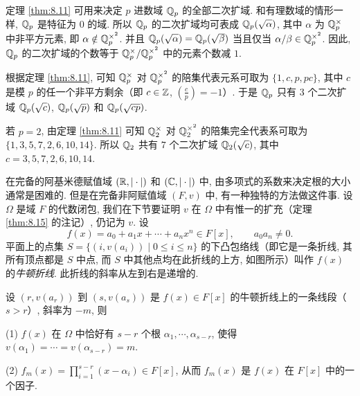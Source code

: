 \begin{remark}
定理 \ref{thm:8.11} 可用来决定 $p$ 进数域 $\mathbb{Q}_p$ 的全部二次扩域. 和有理数域的情形一样, $\mathbb{Q}_p$ 是特征为 $0$ 的域. 所以 $\mathbb{Q}_p$ 的二次扩域均可表成 $\mathbb{Q}_p(\sqrt{\alpha})$, 其中 $\alpha$ 为 $\mathbb{Q}_p^{\times}$ 中非平方元素, 即 $\alpha\notin\mathbb{Q}_p^{\times^2}$. 并且 $\mathbb{Q}_p(\sqrt{\alpha})=\mathbb{Q}_p(\sqrt{\beta})$ 当且仅当 $\alpha/\beta\in\mathbb{Q}_p^{\times^2}$. 因此, $\mathbb{Q}_p$ 的二次扩域的个数等于 $\mathbb{Q}_p^{\times}/\mathbb{Q}_p^{\times^2}$ 中的元素个数减 $1$.

根据定理 \ref{thm:8.11}, 可知 $\mathbb{Q}_p^{\times}$ 对 $\mathbb{Q}_p^{\times^2}$ 的陪集代表元系可取为 $\{1,c,p,pc\}$, 其中 $c$ 是模 $p$ 的任一个非平方剩余（即 $c\in\mathbb{Z}$, $\left(\frac{c}{p}\right)=-1$）. 于是 $\mathbb{Q}_p$ 只有 $3$ 个二次扩域 $\mathbb{Q}_p(\sqrt{c})$, $\mathbb{Q}_p(\sqrt{p})$ 和 $\mathbb{Q}_p(\sqrt{cp})$.

若 $p=2$, 由定理 \ref{thm:8.11} 可知 $\mathbb{Q}_2^{\times}$ 对 $\mathbb{Q}_2^{\times^2}$ 的陪集完全代表系可取为 $\{1,3,5,7,2,6,10,14\}$. 所以 $\mathbb{Q}_2$ 共有 $7$ 个二次扩域 $\mathbb{Q}_2(\sqrt{c})$, 其中 $c=3,5,7,2,6,10,14$.
\end{remark}

在完备的阿基米德赋值域 $(\mathbb{R},|\cdot|)$ 和 $(\mathbb{C},|\cdot|)$ 中, 由多项式的系数来决定根的大小通常是困难的. 但是在完备非阿赋值域 $(F,v)$ 中, 有一种独特的方法做这件事. 设 $\Omega$ 是域 $F$ 的代数闭包, 我们在下节要证明 $v$ 在 $\Omega$ 中有惟一的扩充（定理 \ref{thm:8.15} 的注记）, 仍记为 $v$. 设
\[
  f(x)=a_0+a_1x+\cdots+a_nx^n\in F[x],\qquad a_0a_n\neq 0.
\]
平面上的点集 $S=\{(i,v(a_i))\mid 0\leqslant i\leqslant n\}$ 的下凸包络线（即它是一条折线, 其所有顶点都是 $S$ 中点, 而 $S$ 中其他点均在此折线的上方, 如图所示）叫作 $f(x)$ 的\emph{牛顿折线}. 此折线的斜率从左到右是递增的.

\begin{center}
\end{center}

\begin{theorem}\label{thm:8.12}
设 $(r,v(a_r))$ 到 $(s,v(a_s))$ 是 $f(x)\in F[x]$ 的牛顿折线上的一条线段（$s>r$）, 斜率为 $-m$, 则

(1) $f(x)$ 在 $\Omega$ 中恰好有 $s-r$ 个根 $\alpha_1,\cdots,\alpha_{s-r}$, 使得 $v(\alpha_1)=\cdots=v(\alpha_{s-r})=m$.

(2) $f_m(x)=\prod_{i=1}^{s-r}(x-\alpha_i)\in F[x]$, 从而 $f_m(x)$ 是 $f(x)$ 在 $F[x]$ 中的一个因子.
\end{theorem}

